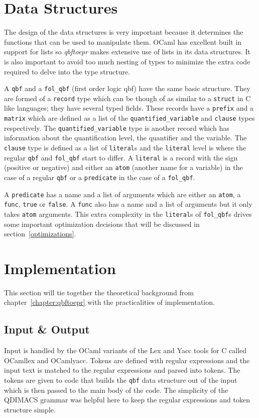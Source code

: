 \section{Data Structures} \label{datastructures}
The design of the data structures is very important because it determines the functions that can be used to manipulate them. OCaml has excellent built in support for lists so \textit{qbftoepr} makes extensive use of lists in its data structures. It is also important to avoid too much nesting of types to minimize the extra code required to delve into the type structure.

A \texttt{qbf} and a \texttt{fol\_qbf} (first order logic \gls{qbf}) have the same basic structure. They are formed of a \texttt{record} type which can be though of as similar to a \texttt{struct} in C like languages; they have several typed fields. These records have a \texttt{prefix} and a \texttt{matrix} which are defined as a list of the \texttt{quantified\_variable} and \texttt{clause} types respectively. The \texttt{quantified\_variable} type is another record which has information about the quantification level, the quantifier and the variable. The \texttt{clause} type is defined as a list of \texttt{literal}s and the \texttt{literal} level is where the regular \texttt{qbf} and \texttt{fol\_qbf} start to differ. A \texttt{literal} is a record with the sign (positive or negative) and either an \texttt{atom} (another name for a variable) in the case of a regular \texttt{qbf} or a \texttt{predicate} in the case of a \texttt{fol\_qbf}.

A \texttt{predicate} has a name and a list of arguments which are either an \texttt{atom}, a \texttt{func}, \texttt{true} or \texttt{false}. A \texttt{func} also has a name and a list of arguments but it only takes \texttt{atom} arguments. This extra complexity in the \texttt{literal}s of \texttt{fol\_qbf}s drives some important optimization decisions that will be discussed in section~\ref{optimizations}.

\section{Implementation}
This section will tie together the theoretical background from chapter~\ref{chapter:qbftoepr} with the practicalities of implementation.

\subsection{Input \& Output}
Input is handled by the OCaml variants of the Lex and Yacc tools for C called OCamllex and OCamlyacc. Tokens are defined with regular expressions and the input text is matched to the regular expressions and parsed into tokens. The tokens are given to code that builds the \texttt{qbf} data structure out of the input which is then passed to the main body of the code. The simplicity of the QDIMACS grammar was helpful here to keep the regular expressions and token structure simple.

